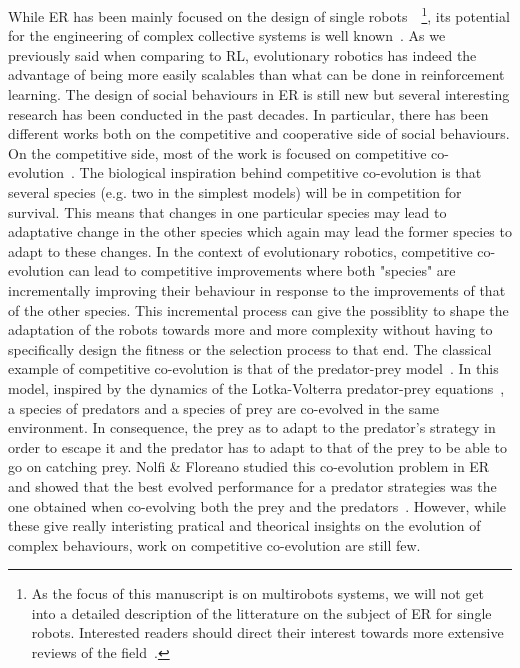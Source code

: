     While ER has been mainly focused on the design of single robots~\parencite{Doncieux2015a}~\footnote{As the focus of this manuscript is on multirobots systems, we will not get into a detailed description of the litterature on the subject of ER for single robots. Interested readers should direct their interest towards more extensive reviews of the field~\parencite{Floreano2008, Bongard2013a, Trianni2014, Doncieux2015a}.}, its potential for the engineering of complex collective systems is well known~\parencite{Baldassarre2003}. As we previously said when comparing to RL, evolutionary robotics has indeed the advantage of being more easily scalables than what can be done in reinforcement learning. The design of social behaviours in ER is still new but several interesting research has been conducted in the past decades. In particular, there has been different works both on the competitive and cooperative side of social behaviours. On the competitive side, most of the work is focused on competitive co-evolution~\parencite{Floreano1998, Floreano2008}. The biological inspiration behind competitive co-evolution is that several species (e.g. two in the simplest models) will be in competition for survival. This means that changes in one particular species may lead to adaptative change in the other species which again may lead the former species to adapt to these changes. In the context of evolutionary robotics, competitive co-evolution can lead to competitive improvements where both "species" are incrementally improving their behaviour in response to the improvements of that of the other species. This incremental process can give the possiblity to shape the adaptation of the robots towards more and more complexity without having to specifically design the fitness or the selection process to that end. The classical example of competitive co-evolution is that of the predator-prey model~\parencite{Floreano1997}. In this model, inspired by the dynamics of the Lotka-Volterra predator-prey equations~\parencite{Yorke1973}, a species of predators and a species of prey are co-evolved in the same environment. In consequence, the prey as to adapt to the predator's strategy in order to escape it and the predator has to adapt to that of the prey to be able to go on catching prey. Nolfi \& Floreano studied this co-evolution problem in ER and showed that the best evolved performance for a predator strategies was the one obtained when co-evolving both the prey and the predators~\parencite{Nolfi1998}. However, while these give really interisting pratical and theorical insights on the evolution of complex behaviours, work on competitive co-evolution are still few.

